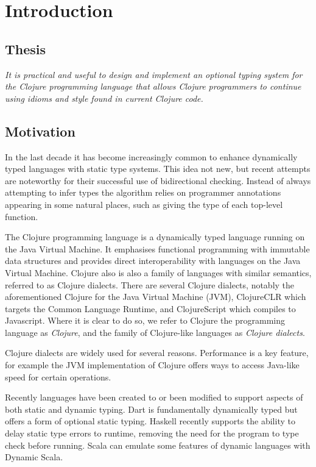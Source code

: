 \chapter{Introduction}

\section{Thesis}

\emph{It is practical and useful to design and implement an optional typing system 
for the Clojure programming language that allows Clojure programmers to continue 
using idioms and style found in current Clojure code.}

\section{Motivation}


In the last decade it has become increasingly common to enhance
dynamically typed languages with static type systems. This idea not new,
but recent attempts are noteworthy for their successful use of bidirectional checking.
Instead of always attempting to infer types the algorithm relies on programmer annotations
appearing in some natural places, such as giving the type of each top-level function.

The Clojure programming language is a dynamically typed language running on the Java Virtual Machine. 
It emphasises functional programming with immutable data structures
and provides direct interoperability with languages on the Java Virtual Machine.
Clojure also is also a family of languages with similar semantics, referred to as Clojure dialects.
There are several Clojure dialects, notably the aforementioned Clojure for the Java Virtual Machine (JVM),
ClojureCLR which targets the Common Language Runtime, and ClojureScript which compiles to Javascript.
Where it is clear to do so, we refer to Clojure the programming language as \emph{Clojure}, 
and the family of Clojure-like languages as \emph{Clojure dialects}.

Clojure dialects are widely used for several reasons.
Performance is a key feature, for example the JVM implementation of Clojure
offers ways to access Java-like speed for certain operations.

Recently languages have been created to or been modified to support aspects
of both static and dynamic typing.
Dart is fundamentally dynamically typed but offers a form of optional
static typing. Haskell recently supports the ability to delay static type errors 
to runtime, removing the need for the program to type check before running.
Scala can emulate some features of dynamic languages with Dynamic Scala.

